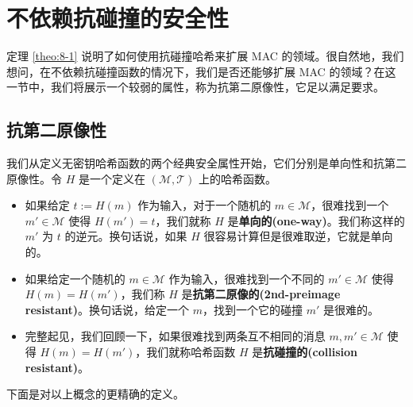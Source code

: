 \section{不依赖抗碰撞的安全性}\label{sec:8-11}

定理 \ref{theo:8-1} 说明了如何使用抗碰撞哈希来扩展 MAC 的领域。很自然地，我们想问，在不依赖抗碰撞函数的情况下，我们是否还能够扩展 MAC 的领域？在这一节中，我们将展示一个较弱的属性，称为抗第二原像性，它足以满足要求。

\subsection{抗第二原像性}\label{subsec:8-11-1}

我们从定义无密钥哈希函数的两个经典安全属性开始，它们分别是单向性和抗第二原像性。令 $H$ 是一个定义在 $(\mathcal{M},\mathcal{T})$ 上的哈希函数。
\begin{itemize}
	\item 如果给定 $t:=H(m)$ 作为输入，对于一个随机的 $m\in\mathcal{M}$，很难找到一个 $m'\in\mathcal{M}$ 使得 $H(m')=t$，我们就称 $H$ 是\textbf{单向的(one-way)}。我们称这样的 $m'$ 为 $t$ 的逆元。换句话说，如果 $H$ 很容易计算但是很难取逆，它就是单向的。
	\item 如果给定一个随机的 $m\in\mathcal{M}$ 作为输入，很难找到一个不同的 $m'\in\mathcal{M}$ 使得 $H(m)=H(m')$，我们称 $H$ 是\textbf{抗第二原像的(2nd-preimage resistant)}。换句话说，给定一个 $m$，找到一个它的碰撞 $m'$ 是很难的。
	\item 完整起见，我们回顾一下，如果很难找到两条互不相同的消息 $m,m'\in\mathcal{M}$ 使得 $H(m)=H(m')$，我们就称哈希函数 $H$ 是\textbf{抗碰撞的(collision resistant)}。
\end{itemize}
下面是对以上概念的更精确的定义。


